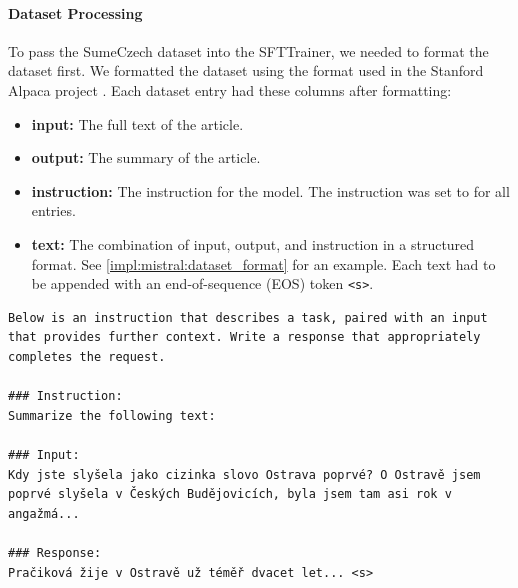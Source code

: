 \documentclass[english, ba, kiv, he, iso690numb, pdf, viewonly]{fasthesis}
\begin{document}
\paragraph{Dataset Processing}
To pass the SumeCzech dataset into the SFTTrainer, we needed to format the dataset first. We formatted the dataset using the format used in the Stanford Alpaca project \cite{alpaca}\cite{touvron2023llama}\cite{wang2023selfinstruct}. Each dataset entry had these columns after formatting:
\begin{itemize}
	\item \textbf{input:} The full text of the article.
	\item \textbf{output:} The summary of the article.
	\item \textbf{instruction:} The instruction for the model. The instruction was set to  for all entries.
	\item \textbf{text:} The combination of input, output, and instruction in a structured format. See \ref{impl:mistral:dataset_format} for an example. Each text had to be appended with an end-of-sequence (EOS) token \texttt{<s>}.
\end{itemize}
\lstset{style=FASThesisLstStyle,} %
\begin{lstlisting}[caption={Example of \texttt{text} column in formatted SumeCzech dataset entry. The input and response were truncated and appended with \texttt{...} due to their long length\label{impl:mistral:dataset_format}}] 
Below is an instruction that describes a task, paired with an input that provides further context. Write a response that appropriately completes the request.

### Instruction:
Summarize the following text:

### Input:
Kdy jste slyšela jako cizinka slovo Ostrava poprvé? O Ostravě jsem poprvé slyšela v Českých Budějovicích, byla jsem tam asi rok v angažmá...

### Response:
Pračiková žije v Ostravě už téměř dvacet let... <s>
\end{lstlisting}
\end{document}
